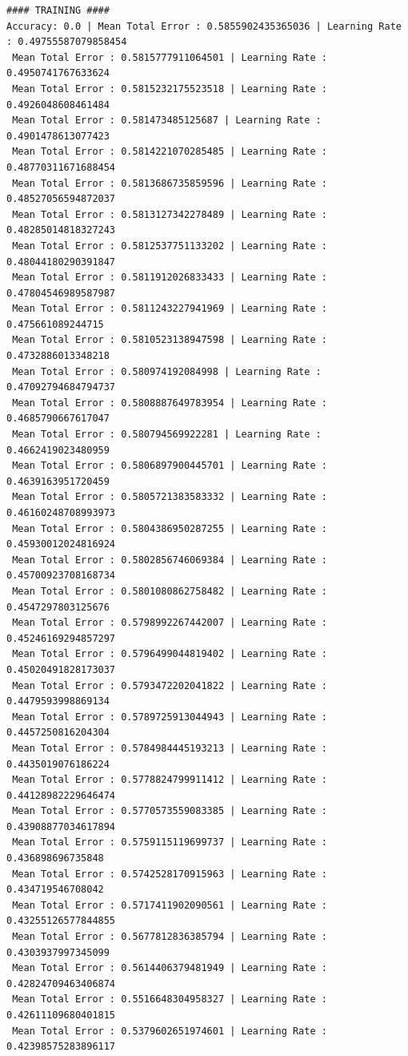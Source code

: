 \documentclass[]{report}
\begin{document}
\begin{verbatim}
#### TRAINING ####
Accuracy: 0.0 | Mean Total Error : 0.5855902435365036 | Learning Rate : 0.49755587079858454
 Mean Total Error : 0.5815777911064501 | Learning Rate : 0.4950741767633624
 Mean Total Error : 0.5815232175523518 | Learning Rate : 0.4926048608461484
 Mean Total Error : 0.581473485125687 | Learning Rate : 0.4901478613077423
 Mean Total Error : 0.5814221070285485 | Learning Rate : 0.48770311671688454
 Mean Total Error : 0.5813686735859596 | Learning Rate : 0.48527056594872037
 Mean Total Error : 0.5813127342278489 | Learning Rate : 0.48285014818327243
 Mean Total Error : 0.5812537751133202 | Learning Rate : 0.48044180290391847
 Mean Total Error : 0.5811912026833433 | Learning Rate : 0.47804546989587987
 Mean Total Error : 0.5811243227941969 | Learning Rate : 0.475661089244715
 Mean Total Error : 0.5810523138947598 | Learning Rate : 0.4732886013348218
 Mean Total Error : 0.580974192084998 | Learning Rate : 0.47092794684794737
 Mean Total Error : 0.5808887649783954 | Learning Rate : 0.4685790667617047
 Mean Total Error : 0.580794569922281 | Learning Rate : 0.4662419023480959
 Mean Total Error : 0.5806897900445701 | Learning Rate : 0.4639163951720459
 Mean Total Error : 0.5805721383583332 | Learning Rate : 0.46160248708993973
 Mean Total Error : 0.5804386950287255 | Learning Rate : 0.45930012024816924
 Mean Total Error : 0.5802856746069384 | Learning Rate : 0.45700923708168734
 Mean Total Error : 0.5801080862758482 | Learning Rate : 0.4547297803125676
 Mean Total Error : 0.5798992267442007 | Learning Rate : 0.45246169294857297
 Mean Total Error : 0.5796499044819402 | Learning Rate : 0.45020491828173037
 Mean Total Error : 0.5793472202041822 | Learning Rate : 0.4479593998869134
 Mean Total Error : 0.5789725913044943 | Learning Rate : 0.4457250816204304
 Mean Total Error : 0.5784984445193213 | Learning Rate : 0.4435019076186224
 Mean Total Error : 0.5778824799911412 | Learning Rate : 0.44128982229646474
 Mean Total Error : 0.5770573559083385 | Learning Rate : 0.43908877034617894
 Mean Total Error : 0.5759115119699737 | Learning Rate : 0.436898696735848
 Mean Total Error : 0.5742528170915963 | Learning Rate : 0.434719546708042
 Mean Total Error : 0.5717411902090561 | Learning Rate : 0.43255126577844855
 Mean Total Error : 0.5677812836385794 | Learning Rate : 0.4303937997345099
 Mean Total Error : 0.5614406379481949 | Learning Rate : 0.42824709463406874
 Mean Total Error : 0.5516648304958327 | Learning Rate : 0.42611109680401815
 Mean Total Error : 0.5379602651974601 | Learning Rate : 0.42398575283896117

\end{verbatim}
\end{document}
